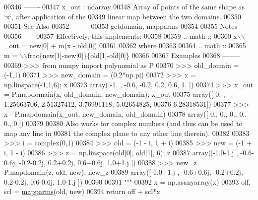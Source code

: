 \begin{DoxyCode}
00346 \textcolor{stringliteral}{    -------}
00347 \textcolor{stringliteral}{    x\_out : ndarray}
00348 \textcolor{stringliteral}{        Array of points of the same shape as `x`, after application of the}
00349 \textcolor{stringliteral}{        linear map between the two domains.}
00350 \textcolor{stringliteral}{}
00351 \textcolor{stringliteral}{    See Also}
00352 \textcolor{stringliteral}{    --------}
00353 \textcolor{stringliteral}{    getdomain, mapparms}
00354 \textcolor{stringliteral}{}
00355 \textcolor{stringliteral}{    Notes}
00356 \textcolor{stringliteral}{    -----}
00357 \textcolor{stringliteral}{    Effectively, this implements:}
00358 \textcolor{stringliteral}{}
00359 \textcolor{stringliteral}{    .. math ::}
00360 \textcolor{stringliteral}{        x\(\backslash\)\(\backslash\)\_out = new[0] + m(x - old[0])}
00361 \textcolor{stringliteral}{}
00362 \textcolor{stringliteral}{    where}
00363 \textcolor{stringliteral}{}
00364 \textcolor{stringliteral}{    .. math ::}
00365 \textcolor{stringliteral}{        m = \(\backslash\)\(\backslash\)frac\{new[1]-new[0]\}\{old[1]-old[0]\}}
00366 \textcolor{stringliteral}{}
00367 \textcolor{stringliteral}{    Examples}
00368 \textcolor{stringliteral}{    --------}
00369 \textcolor{stringliteral}{    >>> from numpy import polynomial as P}
00370 \textcolor{stringliteral}{    >>> old\_domain = (-1,1)}
00371 \textcolor{stringliteral}{    >>> new\_domain = (0,2*np.pi)}
00372 \textcolor{stringliteral}{    >>> x = np.linspace(-1,1,6); x}
00373 \textcolor{stringliteral}{    array([-1. , -0.6, -0.2,  0.2,  0.6,  1. ])}
00374 \textcolor{stringliteral}{    >>> x\_out = P.mapdomain(x, old\_domain, new\_domain); x\_out}
00375 \textcolor{stringliteral}{    array([ 0.        ,  1.25663706,  2.51327412,  3.76991118,  5.02654825,}
00376 \textcolor{stringliteral}{            6.28318531])}
00377 \textcolor{stringliteral}{    >>> x - P.mapdomain(x\_out, new\_domain, old\_domain)}
00378 \textcolor{stringliteral}{    array([ 0.,  0.,  0.,  0.,  0.,  0.])}
00379 \textcolor{stringliteral}{}
00380 \textcolor{stringliteral}{    Also works for complex numbers (and thus can be used to map any line in}
00381 \textcolor{stringliteral}{    the complex plane to any other line therein).}
00382 \textcolor{stringliteral}{}
00383 \textcolor{stringliteral}{    >>> i = complex(0,1)}
00384 \textcolor{stringliteral}{    >>> old = (-1 - i, 1 + i)}
00385 \textcolor{stringliteral}{    >>> new = (-1 + i, 1 - i)}
00386 \textcolor{stringliteral}{    >>> z = np.linspace(old[0], old[1], 6); z}
00387 \textcolor{stringliteral}{    array([-1.0-1.j , -0.6-0.6j, -0.2-0.2j,  0.2+0.2j,  0.6+0.6j,  1.0+1.j ])}
00388 \textcolor{stringliteral}{    >>> new\_z = P.mapdomain(z, old, new); new\_z}
00389 \textcolor{stringliteral}{    array([-1.0+1.j , -0.6+0.6j, -0.2+0.2j,  0.2-0.2j,  0.6-0.6j,  1.0-1.j ])}
00390 \textcolor{stringliteral}{}
00391 \textcolor{stringliteral}{    """}
00392     x = np.asanyarray(x)
00393     off, scl = \hyperlink{namespacepyneb_1_1utils_1_1polyutils_a3621b172891db0806163f72f22e3723b}{mapparms}(old, new)
00394     \textcolor{keywordflow}{return} off + scl*x
\end{DoxyCode}
